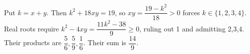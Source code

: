 Put $ k=x+y $. Then $ k^2+18xy=19 $, so $ xy=\dfrac{19-k^2}{18}>0 $ forces $ k\in\{1,2,3,4\}$. Real roots require $ k^2-4xy=\dfrac{11k^2-38}{9}\ge0 $, ruling out 1 and admitting 2,3,4. Their products are $\dfrac{5}{6},\dfrac{5}{9},\dfrac{1}{6}$. Their sum is $\boxed{\dfrac{14}{9}}$.
